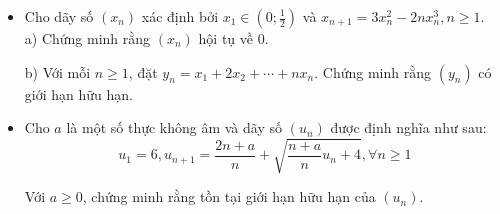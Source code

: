 \documentclass[11pt]{scrartcl}
\begin{document}
\begin{itemize}[label=, leftmargin=0em, itemsep=-0em]

    \item \begin{btvn}
        Cho dãy số $(x_n)$ xác định bởi $x_1\in (0;\frac{1}{2})$ và $x_{n+1}=3x_n^2-2nx_n^3, n\geq 1$.\\
        a) Chứng minh rằng $(x_n)$ hội tụ về $0$.

        
        b) Với mỗi $n\ge 1$, đặt $y_n=x_1+2x_2+\cdots+n x_n$. Chứng minh rằng $(y_n)$ có giới hạn hữu hạn.
    \end{btvn}

    \item \begin{btvn}
        Cho $a$ là một số thực không âm và dãy số $(u_n)$ được định nghĩa như sau:
$$u_1=6, u_{n+1} = \frac{2n+a}{n} + \sqrt{\frac{n+a}{n}u_n+4}, \forall n \ge 1$$

Với $a \ge 0$, chứng minh rằng tồn tại giới hạn hữu hạn của $(u_n)$.
    \end{btvn}


\end{itemize}
\end{document}
